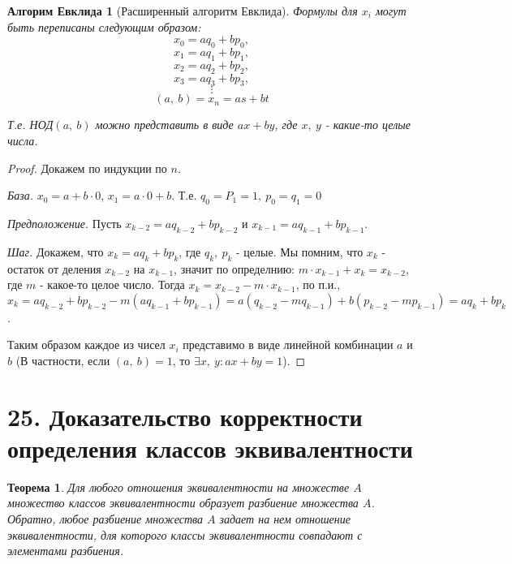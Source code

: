 \documentclass[a4paper,12pt]{article}
\newtheorem*{Evc} {Алгорим Евклида}
\newtheorem*{theorem}{Теорема}
\begin{document}
		\begin{Evc}[Расширенный алгоритм Евклида] 
			Формулы для $x_i$ могут быть переписаны следующим образом:
			$$x_0 = aq_0 + bp_0,$$
			$$x_1 = aq_1 + bp_1,$$
			$$x_2 = aq_2 + bp_2,$$
			$$x_3 = aq_3 + bp_3,$$
	 		$$\vdots$$
			$$(a,\ b) = x_n = as + bt$$

            Т.е. НОД$(a,\ b)$ можно представить в виде $ax + by$, где $x,\ y$ - какие-то целые числа.
		\end{Evc}
		\begin{proof}
			Докажем по индукции по $n$. 

			\textit{База.} $x_0 = a + b \cdot 0$, $x_1 = a \cdot 0 + b$. Т.е. $q_0 = P_1 = 1,\ p_0 = q_1 = 0$

			\textit{Предположение.} Пусть $x_{k - 2} = aq_{k - 2} + bp_{k - 2}$ и $x_{k - 1} = aq_{k - 1} + bp_{k - 1}$.

			\textit{Шаг.} Докажем, что $x_k = aq_{k} + bp_{k}$, где $q_k,\ p_k$ - целые. Мы помним, что $x_k$ - остаток от деления $x_{k - 2}$ на $x_{k - 1}$, значит по определнию: $m\cdot x_{k - 1} + x_k = x_{k - 2}$, где $m$ - какое-то целое число. Тогда $x_k = x_{k - 2} - m \cdot x_{k - 1}$, по п.и., $x_k = aq_{k - 2} + bp_{k - 2} - m(aq_{k - 1} + bp_{k - 1}) = a(q_{k - 2} - mq_{k - 1}) + b(p_{k - 2} - mp_{k - 1}) = aq_{k} + bp_{k}$.

			Таким образом каждое из чисел $x_i$ представимо в виде линейной комбинации $a$ и $b$ (В частности, если $(a,\ b) = 1$, то $\exists x,\ y: ax + by = 1$).
		\end{proof}

        \section*{25. Доказательство корректности определения классов эквивалентности}
        \begin{theorem}
            Для любого отношения эквивалентности на множестве $A$ множество классов эквивалентности образует разбиение множества $A$. Обратно, любое разбиение множества $A$ задает на нем отношение эквивалентности, для которого классы эквивалентности совпадают с элементами разбиения.
        \end{theorem}
\end{document}
